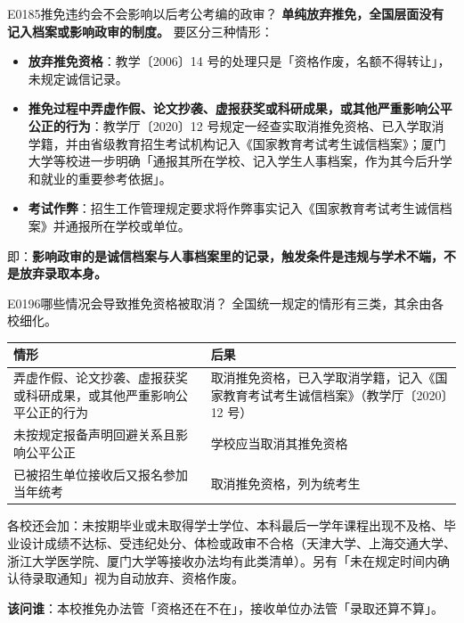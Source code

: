 \begin{qa}{E0185}{推免违约会不会影响以后考公考编的政审？}
\textbf{单纯放弃推免，全国层面没有记入档案或影响政审的制度。} 要区分三种情形：
\begin{itemize}
  \item \textbf{放弃推免资格}：教学〔2006〕14 号的处理只是「资格作废，名额不得转让」，未规定诚信记录。
  \item \textbf{推免过程中弄虚作假、论文抄袭、虚报获奖或科研成果，或其他严重影响公平公正的行为}：教学厅〔2020〕12 号规定一经查实取消推免资格、已入学取消学籍，并由省级教育招生考试机构记入《国家教育考试考生诚信档案》；厦门大学等校进一步明确「通报其所在学校、记入学生人事档案，作为其今后升学和就业的重要参考依据」。
  \item \textbf{考试作弊}：招生工作管理规定要求将作弊事实记入《国家教育考试考生诚信档案》并通报所在学校或单位。
\end{itemize}

即：\textbf{影响政审的是诚信档案与人事档案里的记录，触发条件是违规与学术不端，不是放弃录取本身。}
\end{qa}

\begin{qa}{E0196}{哪些情况会导致推免资格被取消？}
全国统一规定的情形有三类，其余由各校细化。
\par\vspace{2pt}\nobreak\begin{center}\footnotesize
\begin{tabularx}{\textwidth}{>{\raggedright\arraybackslash}X>{\raggedright\arraybackslash}X}
\toprule
\textbf{情形} & \textbf{后果} \\ \midrule
弄虚作假、论文抄袭、虚报获奖或科研成果，或其他严重影响公平公正的行为 & 取消推免资格，已入学取消学籍，记入《国家教育考试考生诚信档案》（教学厅〔2020〕12 号） \\
未按规定报备声明回避关系且影响公平公正 & 学校应当取消其推免资格 \\
已被招生单位接收后又报名参加当年统考 & 取消推免资格，列为统考生 \\
\bottomrule
\end{tabularx}
\end{center}\vspace{2pt}\par

各校还会加：未按期毕业或未取得学士学位、本科最后一学年课程出现不及格、毕业设计成绩不达标、受违纪处分、体检或政审不合格（天津大学、上海交通大学、浙江大学医学院、厦门大学等接收办法均有此类清单）。另有「未在规定时间内确认待录取通知」视为自动放弃、资格作废。

\textbf{该问谁}：本校推免办法管「资格还在不在」，接收单位办法管「录取还算不算」。
\end{qa}

